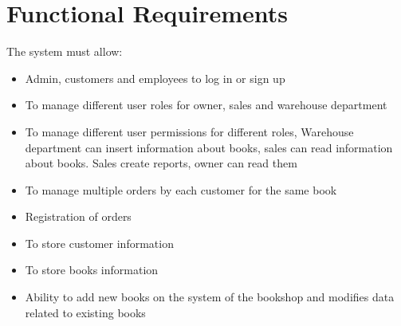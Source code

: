 \section{Functional Requirements}
The system must allow:

\begin{itemize}
   \item Admin, customers and employees to log in or sign up
    \item To manage different user roles for owner, sales and warehouse department
    \item To manage different user permissions for different roles, Warehouse department can insert information about books, sales can read information about books. Sales create reports, owner can read them
    \item To manage multiple orders by each customer for the same book
    \item Registration of orders
    \item To store customer information
    \item To store books information
    \item Ability to add new books on the system of the bookshop and modifies data related to existing books
\end{itemize}
